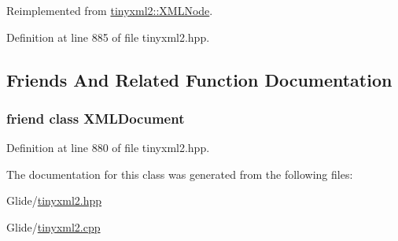 Reimplemented from \hyperlink{classtinyxml2_1_1_x_m_l_node_a157ce3a00ea5ee5a85b7103138e85e8a}{tinyxml2\-::\-X\-M\-L\-Node}.



Definition at line 885 of file tinyxml2.\-hpp.



\subsection{Friends And Related Function Documentation}
\hypertarget{classtinyxml2_1_1_x_m_l_comment_a4eee3bda60c60a30e4e8cd4ea91c4c6e}{
\subsubsection[{X\-M\-L\-Document}]{\setlength{\rightskip}{0pt plus 5cm}friend class {\bf X\-M\-L\-Document}\hspace{0.3cm}{\ttfamily [friend]}}}\label{classtinyxml2_1_1_x_m_l_comment_a4eee3bda60c60a30e4e8cd4ea91c4c6e}


Definition at line 880 of file tinyxml2.\-hpp.



The documentation for this class was generated from the following files\-:\begin{DoxyCompactItemize}
\item 
Glide/\hyperlink{tinyxml2_8hpp}{tinyxml2.\-hpp}\item 
Glide/\hyperlink{tinyxml2_8cpp}{tinyxml2.\-cpp}\end{DoxyCompactItemize}
